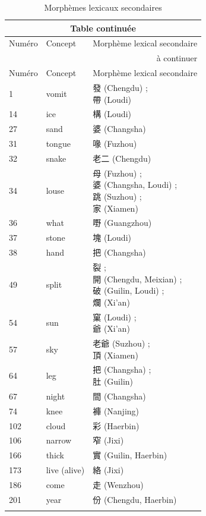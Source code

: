 \documentclass{scrbook}
\newcounter{c}[subsubsection]
\begin{document}
\begin{sloppypar}
\begin{appendices}
\begin{longtable}[htbp]{lll}
    \endfirsthead
	
	\multicolumn{3}{c}{Table continuée}\\
    \toprule
    Numéro & Concept & Morphème lexical secondaire \\
    \hline
    \endhead

    \hline
    \multicolumn{3}{r}{à continuer} \\
    \endfoot
    \endlastfoot
    
    \toprule
    Numéro & Concept & Morphème lexical secondaire \\
    \midrule
    1     & vomit & \makecell[l]{發 (Chengdu) ; \\帶 (Loudi)} \\
    14    & ice   & 構 (Loudi) \\
    27    & sand  & 婆 (Changsha) \\
    31    & tongue & 喙 (Fuzhou) \\
    32    & snake & 老二 (Chengdu) \\
    34    & louse & \makecell[l]{母 (Fuzhou) ; \\婆 (Changsha, Loudi) ; \\跳 (Suzhou) ; \\家 (Xiamen)} \\
    36    & what  & 嘢 (Guangzhou) \\
    37    & stone & 塊 (Loudi) \\
    38    & hand  & 把 (Changsha) \\
    49    & split & \makecell[l]{裂 ; \\開 (Chengdu, Meixian) ; \\破 (Guilin, Loudi) ; \\爛 (Xi'an)} \\
    54    & sun   & \makecell[l]{窠 (Loudi) ; \\爺 (Xi'an)} \\
    57    & sky   & \makecell[l]{老爺 (Suzhou) ; \\頂 (Xiamen)} \\
    64    & leg   & \makecell[l]{把 (Changsha) ; \\肚 (Guilin)} \\
    67    & night & 間 (Changsha) \\
    74    & knee  & 褲 (Nanjing) \\
	102   & cloud & 彩 (Haerbin) \\    
    106   & narrow & 窄 (Jixi) \\
    166   & thick & 實 (Guilin, Haerbin) \\
    173   & live (alive) & 絡 (Jixi) \\
    186   & come  & 走 (Wenzhou) \\
    201   & year  & 份 (Chengdu, Haerbin) \\
    \bottomrule
  \caption{Morphèmes lexicaux secondaires}
  \label{tab:addlabel}%
\end{longtable}%


\end{appendices}
\end{sloppypar}
\end{document}
